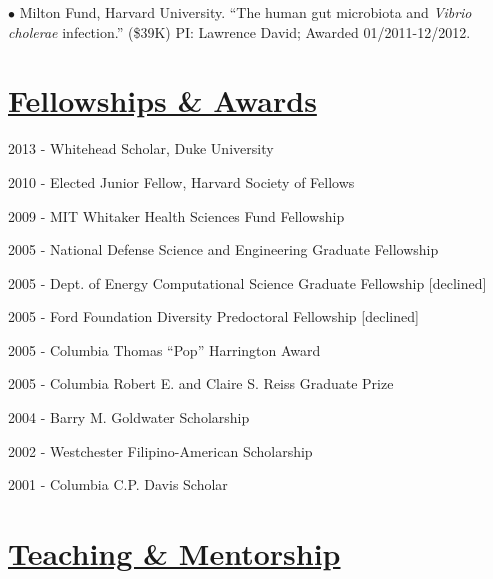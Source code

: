 \documentclass[overlapped,line,11pt]{res}
\newenvironment{list1}{
  \begin{list}{\ding{113}}{%
      \setlength{\itemsep}{0in}
      \setlength{\parsep}{0in} \setlength{\parskip}{0in}
      \setlength{\topsep}{0in} \setlength{\partopsep}{0in} 
      \setlength{\leftmargin}{0.17in}}}{\end{list}}
\begin{document}
\begin{resume}
\vspace{-10mm}
\hangindent=0.5in $\bullet$\hspace{.1in} Milton Fund, Harvard
University. ``The human gut microbiota and \emph{Vibrio cholerae}
infection.'' (\$39K) PI: Lawrence David; Awarded 01/2011-12/2012. 

\section{\underline{\sc Fellowships \& Awards}} 
\vspace{.25in}
\begin{list1}
\item[] 2013 - Whitehead Scholar, Duke University%
\item[] 2010 - Elected Junior Fellow, Harvard Society of Fellows%
\item[] 2009 - MIT Whitaker Health Sciences Fund Fellowship %
\item[] 2005 - National Defense Science and Engineering Graduate
  Fellowship %
\item[] 2005 - Dept. of Energy Computational Science Graduate Fellowship
  [declined] %
\item[] 2005 - Ford Foundation Diversity Predoctoral Fellowship
  [declined] %
\item[] 2005 - Columbia Thomas ``Pop'' Harrington Award
\item[] 2005 - Columbia Robert E. and Claire S. Reiss Graduate Prize
\item[] 2004 - Barry M. Goldwater Scholarship
\item[] 2002 - Westchester Filipino-American Scholarship
\item[] 2001 - Columbia C.P. Davis Scholar
\end{list1}

\section{\underline{\sc Teaching \& Mentorship}}
\vspace{.05in}

\hangindent=0.5in 


\end{resume}
\end{document}
